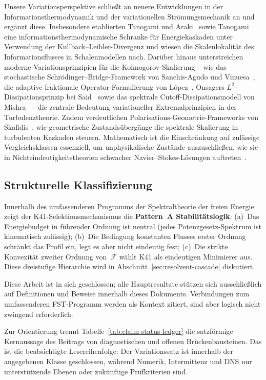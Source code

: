 \documentclass[12pt,a4paper]{article}
\theoremstyle{definition}
\theoremstyle{plain}
\theoremstyle{remark}
\begin{document}
Unsere Variationsperspektive schließt an neuere Entwicklungen in der Informationsthermodynamik und der variationellen Strömungsmechanik an und ergänzt diese. Insbesondere etablierten Tanogami und Araki~\cite{Tanogami2023} sowie Tanogami~\cite{Tanogami2025} eine informationsthermodynamische Schranke für Energiekaskaden unter Verwendung der Kullback--Leibler-Divergenz und wiesen die Skalenlokalität des Informationsflusses in Schalenmodellen nach. Darüber hinaus unterstreichen moderne Variationsprinzipien für die Kolmogorov-Skalierung -- wie das stochastische Schrödinger--Bridge-Framework von Sanchis-Agudo und Vinuesa~\cite{SanchisAgudoVinuesa2025}, die adaptive fraktionale Operator-Formulierung von López~\cite{Lopez2026}, Onsagers $L^2$-Dissipationsprinzip bei Said~\cite{Said2025} sowie das spektrale Cutoff-Dissipationsmodell von Mishra~\cite{Mishra2026} -- die zentrale Bedeutung variationeller Extremalprinzipien in der Turbulenztheorie. Zudem verdeutlichen Polarisations-Geometrie-Frameworks von Skalidis~\cite{Skalidis2026}, wie geometrische Zustandsübergänge die spektrale Skalierung in turbulenten Kaskaden steuern. Mathematisch ist die Einschränkung auf zulässige Vergleichsklassen essenziell, um unphysikalische Zustände auszuschließen, wie sie in Nichteindeutigkeitstheorien schwacher Navier--Stokes-Lösungen auftreten~\cite{BuckmasterVicol2019,Isett2018}.

\subsection{Strukturelle Klassifizierung}

Innerhalb des umfassenderen Programms der Spektraltheorie der freien
Energie~\cite{FST-Unified2026} zeigt der K41-Selektionsmechanismus die
\textbf{Pattern~A Stabilitätslogik}: (a)~Das Energiebudget in führender Ordnung ist
neutral (jedes Potenzgesetz-Spektrum ist kinematisch zulässig); (b)~Die
Bedingung konstanten Flusses erster Ordnung schränkt das Profil ein, legt es aber nicht
eindeutig fest; (c)~Die strikte Konvexität zweiter Ordnung
von~$\mathcal{F}$ wählt K41 als eindeutigen Minimierer aus. Diese dreistufige
Hierarchie wird in Abschnitt~\ref{sec:resolvent-cascade} diskutiert.

Diese Arbeit ist in sich geschlossen; alle Hauptresultate stützen sich ausschließlich auf Definitionen
und Beweise innerhalb dieses Dokuments. Verbindungen zum umfassenderen FST-Programm
werden als Kontext zitiert, sind aber logisch nicht zwingend erforderlich.

Zur Orientierung trennt Tabelle~\ref{tab:claim-status-ledger} die
satzförmige Kernaussage des Beitrags von diagnostischen und offenen
Brückenbausteinen. Das ist die beabsichtigte Lesereihenfolge: Der
Variationssatz ist innerhalb der angegebenen Klasse geschlossen, während
Numerik, Intermittenz und DNS nur unterstützende Ebenen oder zukünftige
Prüfkriterien sind.
\end{document}
